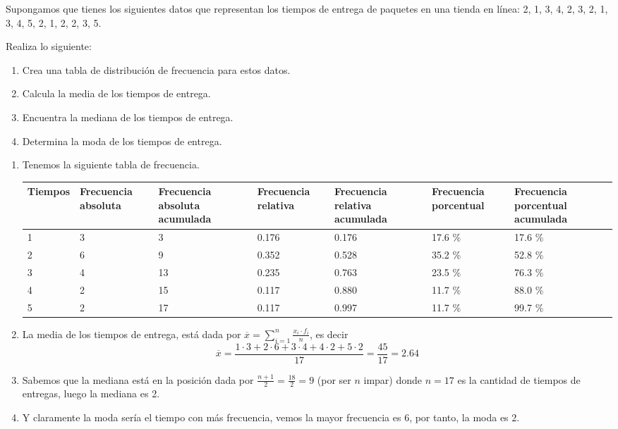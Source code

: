 \begin{exercise}
    Supongamos que tienes los siguientes datos que representan los tiempos de entrega de paquetes en una tienda en línea:
    2, 1, 3, 4, 2, 3, 2, 1, 3, 4, 5, 2, 1, 2, 2, 3, 5.

    Realiza lo siguiente:
    \begin{enumerate}
        \item Crea una tabla de distribución de frecuencia para estos datos.
        \item Calcula la media de los tiempos de entrega.
        \item Encuentra la mediana de los tiempos de entrega.
        \item Determina la moda de los tiempos de entrega.
    \end{enumerate}
\end{exercise}
\begin{solution}
    \begin{enumerate}
        \item Tenemos la siguiente tabla de frecuencia.
        \begin{table}[H]
            \centering
            \begin{tabular}{|p{1.7cm}|p{1.8cm}|p{2cm}|p{1.8cm}|p{2cm}|p{2cm}|p{2cm}|}
                \hline
                Tiempos & Frecuencia absoluta & Frecuencia absoluta acumulada & Frecuencia relativa & Frecuencia relativa acumulada & Frecuencia porcentual & Frecuencia porcentual acumulada\\
                \hline\hline
                1 & 3 &  3 & 0.176 & 0.176 & 17.6 \% & 17.6 \% \\\hline
                2 & 6 &  9 & 0.352 & 0.528 & 35.2 \% & 52.8 \% \\\hline
                3 & 4 & 13 & 0.235 & 0.763 & 23.5 \% & 76.3 \% \\\hline
                4 & 2 & 15 & 0.117 & 0.880 & 11.7 \% & 88.0 \% \\\hline
                5 & 2 & 17 & 0.117 & 0.997 & 11.7 \% & 99.7 \% \\\hline
            \end{tabular}
        \end{table}
        \item La media de los tiempos de entrega, está dada por $\overline{x} = \sum_{i = 1}^{n} \frac{x_i \cdot f_i}{n}$, es decir
        \[
            \overline{x} = \frac{1\cdot 3 + 2\cdot 6 + 3\cdot4 + 4\cdot2 + 5\cdot2}{17} = \frac{45}{17} = 2.64
        \]
        \item Sabemos que la mediana está en la posición dada por $\frac{n + 1}{2} = \frac{18}{2} = 9$ (por ser $n$ impar) donde $n = 17$ es la cantidad de tiempos de entregas, luego la mediana es 2.
        \item Y claramente la moda sería el tiempo con más frecuencia, vemos la mayor frecuencia es 6, por tanto, la moda es 2. \qedhere
    \end{enumerate}
\end{solution}